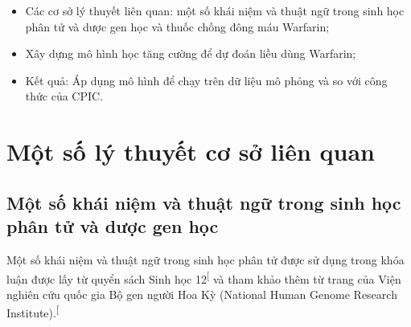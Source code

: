 \documentclass[14pt,oneside]{scrbook}
\providecommand{\tightlist}{\setlength{\itemsep}{\smallskipamount}\setlength{\parskip}{\smallskipamount}}
\begin{document}
\begin{itemize}
\tightlist
\item
  Các cơ sở lý thuyết liên quan: một số khái niệm và thuật ngữ trong
  sinh học phân tử và dược gen học và thuốc chống đông máu Warfarin;
\item
  Xây dựng mô hình học tăng cường để dự đoán liều dùng Warfarin;
\item
  Kết quả: Áp dụng mô hình để chạy trên dữ liệu mô phỏng và so với công
  thức của CPIC.
\end{itemize}

\chapter{Một số lý thuyết cơ sở liên
quan}\label{mux1ed9t-sux1ed1-luxfd-thuyux1ebft-cux1a1-sux1edf-liuxean-quan}

\section{Một số khái niệm và thuật ngữ trong sinh học phân tử và dược
gen
học}\label{mux1ed9t-sux1ed1-khuxe1i-niux1ec7m-vuxe0-thuux1eadt-ngux1eef-trong-sinh-hux1ecdc-phuxe2n-tux1eed-vuxe0-dux1b0ux1ee3c-gen-hux1ecdc}

Một số khái niệm và thuật ngữ trong sinh học phân tử được sử dụng trong
khóa luận được lấy từ quyển sách Sinh học
12\textsuperscript{{[}\citeproc{ref-sinh12}{3}{]}} và tham khảo thêm từ
trang của Viện nghiên cứu quốc gia Bộ gen người Hoa Kỳ (National Human
Genome Research
Institute).\textsuperscript{{[}\citeproc{ref-nhgri}{4}{]}}
\end{document}
